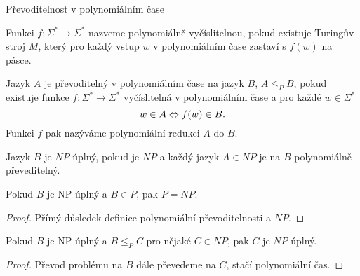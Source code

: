     
    
    
    
    \begin{frame}{Převoditelnost v polynomiálním čase}
    \begin{definition}
    Funkci $f: \Sigma^*\to \Sigma^*$ nazveme \alert{polynomiálně vyčíslitelnou}, pokud existuje Turingův stroj $M$, který pro každý vstup $w$ v polynomiálním čase zastaví s $f(w)$ na pásce.
    
    Jazyk $A$ je \alert{převoditelný v polynomiálním čase} na jazyk $B$, $A\leq_P B$, pokud existuje funkce $f: \Sigma^*\to \Sigma^*$ vyčíslitelná v polynomiálním čase a pro každé $w\in \Sigma^*$
    $$w\in A \Leftrightarrow f(w)\in B\hbox{.}
    $$
    Funkci $f$ pak nazýváme \alert{polynomiální redukci $A$ do $B$}.
    \end{definition}
    
    \begin{definition}[$NP$ úplnost]
    Jazyk $B$ je \alert{$NP$ úplný}, pokud je $NP$ a každý jazyk $A\in NP$ je na $B$ polynomiálně převeditelný.
    \end{definition}
    
    \end{frame}
    
    \begin{frame}{}
    \begin{theorem}
    Pokud $B$ je NP-úplný a $B\in P$, pak $P=NP$.
    \end{theorem}
    \begin{proof}
    Přímý důsledek definice polynomiální převoditelnosti a $NP$.
    \end{proof}
    \begin{theorem}
    Pokud $B$ je NP-úplný a $B\leq_P C$ pro nějaké $C\in NP$, pak $C$ je $NP$-úplný.
    \end{theorem}
    \begin{proof}
    Převod problému na $B$ dále převedeme na $C$, stačí polynomiální čas.
    \end{proof}
    
    
    \end{frame}
    
    
    
    
    

